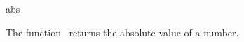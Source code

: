 \begin{ccRefFunction}{abs}

\ccDefinition

The function \ccRefName\ returns the absolute value of a number.


{}

\end{ccRefFunction}

